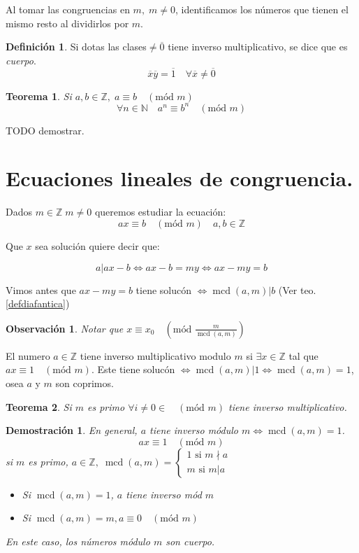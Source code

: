 \documentclass[9pt,a4paper,draft]{article}
\theoremstyle{definition}
\newtheorem{defi}{Definición}
\theoremstyle{plain}
\newtheorem{teo}{Teorema}
\newtheorem{demo}{Demostración}[teo]
\newtheorem{obs}{Observación}
\DeclareMathOperator{\mcd}{mcd}
\newcommand{\modu}[1]{\quad(\text{mód }#1)}
\begin{document}
Al tomar las congruencias en $m,\; m\neq{0}$, identificamos los números que tienen el mismo resto al dividirlos por $m$.

\begin{defi} Si dotas las clases$\neq\overline{0}$ tiene inverso multiplicativo, se dice que es {\itshape  cuerpo}.
$$\overline{x}\overline{y}=\overline{1}\quad \forall{\overline{x}\neq\overline{0}}$$
\end{defi}

\begin{teo} Si $a,b\in{\mathbb{Z}},\; a\equiv{b}\modu{m}$
$$\forall{n\in{\mathbb{N}}}\quad a^n\equiv{b^n}\modu{m}$$
\end{teo} TODO demostrar.

\section{Ecuaciones lineales de congruencia.}

Dados $m\in{\mathbb{Z}}\; m\neq{0}$ queremos estudiar la ecuación:
$$ax\equiv{b}\modu{m}\quad a,b\in{\mathbb{Z}}$$

Que $x$ sea solución quiere decir que:

$$a|ax-b \iff ax-b=my \iff ax-my=b$$

Vimos antes que $ax-my=b$ tiene solucón $\iff \mcd(a,m)|b$ (Ver teo. \ref{defdiafantica})

\begin{obs}
Notar que $x\equiv{x_0}\modu{\frac{m}{\mcd(a,m)}}$
\end{obs}

El numero $a\in{\mathbb{Z}}$ tiene inverso multiplicativo modulo $m$ si $\exists x\in{\mathbb{Z}}$ tal que $ax\equiv{1}\modu{m}$. Este tiene solucón $\iff\mcd(a,m)|1 \iff \mcd(a,m)=1$, osea $a$ y $m$ son coprimos.

\begin{teo} Si $m$ es primo $\forall i\neq{0}\in{\modu{m}}$ tiene inverso multiplicativo.\end{teo}

\begin{demo}
En general, $a$ tiene inverso módulo $m\iff\mcd(a,m)=1$.
$$ax\equiv1\modu{m}$$
si $m$ es primo, $a\in{\mathbb{Z}},\; \mcd(a,m) = \begin{cases} 1\text{ si }m\nmid a \\ m\text{ si } m|a\end{cases}$

\begin{itemize}
\item Si $\mcd(a,m)=1$, $a$ tiene inverso mód $m$
\item Si $\mcd(a,m)=m, a\equiv{0}\modu{m}$
\end{itemize}

En este caso, los números módulo $m$ son cuerpo.
\end{demo}
\end{document}
